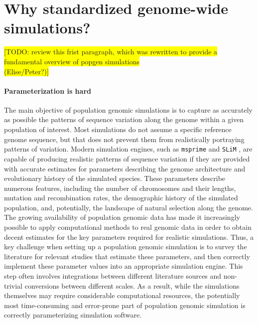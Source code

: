 \documentclass[hidelinks]{article}
\begin{document}


\hypertarget{sec2}{%
	\section*{Why standardized genome-wide simulations?}\label{sec:std-sim}}



%

\colorbox{yellow}{[TODO:  review this frist paragraph, which was rewritten to
	provide a fundamental overview of popgen simulations}\\
\colorbox{yellow}{ (Elise/Peter?)]}
	
\paragraph*{Parameterization is hard}	
The main objective of population genomic simulations is to capture as accurately as possible
the patterns of sequence variation along the genome within a given population of interest.
Most simulations do not assume a specific reference genome sequence, 
but that does not prevent them from realistically portraying patterns of variation.
Modern simulation engines, such as \texttt{msprime} \citep{Kelleher2016,Nelson2020} 
and \texttt{SLiM} \citep{Haller2019}, are capable of producing realistic patterns of sequence variation
if they are provided with accurate estimates for parameters describing the genome architecture
and evolutionary history of the simulated species. 
These parameters describe numerous features, including the number of chromosomes and their lengths,
mutation and recombination rates, the demographic history of the simulated population,
and, potentially, the landscape of natural selection along the genome. 
The growing availability of population genomic data has made it increasingly possible
to apply computational methods to real genomic data in order to obtain decent estimates
for the key parameters required for realistic simulations. 
Thus, a key challenge when setting up a population genomic simulation is to
survey the literature for relevant studies that estimate these parameters, 
and then correctly implement these parameter values into an appropriate simulation engine.
This step often involves integrations between different literature sources and
non-trivial conversions between different scales.
As a result, while the simulations themselves may require considerable computational resources,
the potentially most time-consuming and error-prone part of population genomic simulation is
correctly parameterizing simulation software.
\end{document}
